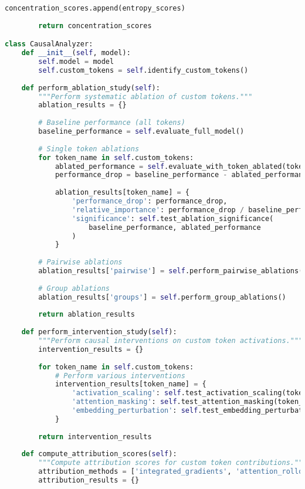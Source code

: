 \begin{lstlisting}[language=Python, caption=Comprehensive evaluation framework for custom tokens]
            concentration_scores.append(entropy_scores)
        
        return concentration_scores

class CausalAnalyzer:
    def __init__(self, model):
        self.model = model
        self.custom_tokens = self.identify_custom_tokens()
    
    def perform_ablation_study(self):
        """Perform systematic ablation of custom tokens."""
        ablation_results = {}
        
        # Baseline performance (all tokens)
        baseline_performance = self.evaluate_full_model()
        
        # Single token ablations
        for token_name in self.custom_tokens:
            ablated_performance = self.evaluate_with_token_ablated(token_name)
            performance_drop = baseline_performance - ablated_performance
            
            ablation_results[token_name] = {
                'performance_drop': performance_drop,
                'relative_importance': performance_drop / baseline_performance,
                'significance': self.test_ablation_significance(
                    baseline_performance, ablated_performance
                )
            }
        
        # Pairwise ablations
        ablation_results['pairwise'] = self.perform_pairwise_ablations()
        
        # Group ablations
        ablation_results['groups'] = self.perform_group_ablations()
        
        return ablation_results
    
    def perform_intervention_study(self):
        """Perform causal interventions on custom token activations."""
        intervention_results = {}
        
        for token_name in self.custom_tokens:
            # Perform various interventions
            intervention_results[token_name] = {
                'activation_scaling': self.test_activation_scaling(token_name),
                'attention_masking': self.test_attention_masking(token_name),
                'embedding_perturbation': self.test_embedding_perturbation(token_name)
            }
        
        return intervention_results
    
    def compute_attribution_scores(self):
        """Compute attribution scores for custom token contributions."""
        attribution_methods = ['integrated_gradients', 'attention_rollout', 'shap']
        attribution_results = {}
        

\end{lstlisting}
